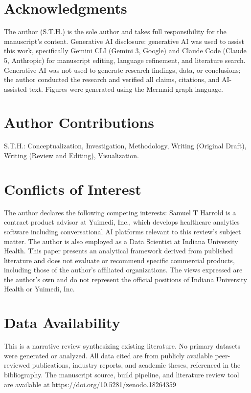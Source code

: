 \documentclass[
  american,
  11pt,
  letterpaper,
  oneside  ,captions=tableheading
]{scrartcl}
\begin{document}
\section{Acknowledgments}\label{acknowledgments}

The author (S.T.H.) is the sole author and takes full responsibility for
the manuscript's content. Generative AI disclosure: generative AI was
used to assist this work, specifically Gemini CLI (Gemini 3, Google) and
Claude Code (Claude 5, Anthropic) for manuscript editing, language
refinement, and literature search. Generative AI was not used to
generate research findings, data, or conclusions; the author conducted
the research and verified all claims, citations, and AI-assisted text.
Figures were generated using the Mermaid graph language.

\section{Author Contributions}\label{author-contributions}

S.T.H.: Conceptualization, Investigation, Methodology, Writing (Original
Draft), Writing (Review and Editing), Visualization.

\section{Conflicts of Interest}\label{conflicts-of-interest}

The author declares the following competing interests: Samuel T Harrold
is a contract product advisor at Yuimedi, Inc., which develops
healthcare analytics software including conversational AI platforms
relevant to this review's subject matter. The author is also employed as
a Data Scientist at Indiana University Health. This paper presents an
analytical framework derived from published literature and does not
evaluate or recommend specific commercial products, including those of
the author's affiliated organizations. The views expressed are the
author's own and do not represent the official positions of Indiana
University Health or Yuimedi, Inc.

\section{Data Availability}\label{data-availability}

This is a narrative review synthesizing existing literature. No primary
datasets were generated or analyzed. All data cited are from publicly
available peer-reviewed publications, industry reports, and academic
theses, referenced in the bibliography. The manuscript source, build
pipeline, and literature review tool are available at
https://doi.org/10.5281/zenodo.18264359
\end{document}

